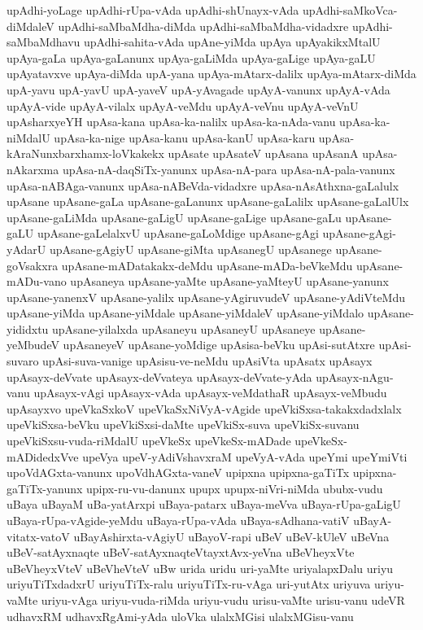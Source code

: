 {upAdhi-yoLage
upAdhi-rUpa-vAda
upAdhi-shUnayx-vAda
upAdhi-saMkoVca-diMdaleV
upAdhi-saMbaMdha-diMda
upAdhi-saMbaMdha-vidadxre
upAdhi-saMbaMdhavu
upAdhi-sahita-vAda
upAne-yiMda
upAya
upAyakikxMtalU
upAya-gaLa
upAya-gaLanunx
upAya-gaLiMda
upAya-gaLige
upAya-gaLU
upAyatavxve
upAya-diMda
upA-yana
upAya-mAtarx-dalilx
upAya-mAtarx-diMda
upA-yavu
upA-yavU
upA-yaveV
upA-yAvagade
upAyA-vanunx
upAyA-vAda
upAyA-vide
upAyA-vilalx
upAyA-veMdu
upAyA-veVnu
upAyA-veVnU
upAsharxyeYH
upAsa-kana
upAsa-ka-nalilx
upAsa-ka-nAda-vanu
upAsa-ka-niMdalU
upAsa-ka-nige
upAsa-kanu
upAsa-kanU
upAsa-karu
upAsa-kAraNunxbarxhamx-loVkakekx
upAsate
upAsateV
upAsana
upAsanA
upAsa-nAkarxma
upAsa-nA-daqSiTx-yanunx
upAsa-nA-para
upAsa-nA-pala-vanunx
upAsa-nABAga-vanunx
upAsa-nABeVda-vidadxre
upAsa-nAsAthxna-gaLalulx
upAsane
upAsane-gaLa
upAsane-gaLanunx
upAsane-gaLalilx
upAsane-gaLalUlx
upAsane-gaLiMda
upAsane-gaLigU
upAsane-gaLige
upAsane-gaLu
upAsane-gaLU
upAsane-gaLelalxvU
upAsane-gaLoMdige
upAsane-gAgi
upAsane-gAgi-yAdarU
upAsane-gAgiyU
upAsane-giMta
upAsanegU
upAsanege
upAsane-goVsakxra
upAsane-mADatakakx-deMdu
upAsane-mADa-beVkeMdu
upAsane-mADu-vano
upAsaneya
upAsane-yaMte
upAsane-yaMteyU
upAsane-yanunx
upAsane-yanenxV
upAsane-yalilx
upAsane-yAgiruvudeV
upAsane-yAdiVteMdu
upAsane-yiMda
upAsane-yiMdale
upAsane-yiMdaleV
upAsane-yiMdalo
upAsane-yididxtu
upAsane-yilalxda
upAsaneyu
upAsaneyU
upAsaneye
upAsane-yeMbudeV
upAsaneyeV
upAsane-yoMdige
upAsisa-beVku
upAsi-sutAtxre
upAsi-suvaro
upAsi-suva-vanige
upAsisu-ve-neMdu
upAsiVta
upAsatx
upAsayx
upAsayx-deVvate
upAsayx-deVvateya
upAsayx-deVvate-yAda
upAsayx-nAgu-vanu
upAsayx-vAgi
upAsayx-vAda
upAsayx-veMdathaR
upAsayx-veMbudu
upAsayxvo
upeVkaSxkoV
upeVkaSxNiVyA-vAgide
upeVkiSxsa-takakxdadxlalx
upeVkiSxsa-beVku
upeVkiSxsi-daMte
upeVkiSx-suva
upeVkiSx-suvanu
upeVkiSxsu-vuda-riMdalU
upeVkeSx
upeVkeSx-mADade
upeVkeSx-mADidedxVve
upeVya
upeV-yAdiVshavxraM
upeVyA-vAda
upeYmi
upeYmiVti
upoVdAGxta-vanunx
upoVdhAGxta-vaneV
upipxna
upipxna-gaTiTx
upipxna-gaTiTx-yanunx
upipx-ru-vu-danunx
upupx
upupx-niVri-niMda
ububx-vudu
uBaya
uBayaM
uBa-yatArxpi
uBaya-patarx
uBaya-meVva
uBaya-rUpa-gaLigU
uBaya-rUpa-vAgide-yeMdu
uBaya-rUpa-vAda
uBaya-sAdhana-vatiV
uBayA-vitatx-vatoV
uBayAshirxta-vAgiyU
uBayoV-rapi
uBeV
uBeV-kUleV
uBeVna
uBeV-satAyxnaqte
uBeV-satAyxnaqteVtayxtAvx-yeVna
uBeVheyxVte
uBeVheyxVteV
uBeVheVteV
uBw
urida
uridu
uri-yaMte
uriyalapxDalu
uriyu
uriyuTiTxdadxrU
uriyuTiTx-ralu
uriyuTiTx-ru-vAga
uri-yutAtx
uriyuva
uriyu-vaMte
uriyu-vAga
uriyu-vuda-riMda
uriyu-vudu
urisu-vaMte
urisu-vanu
udeVR
udhavxRM
udhavxRgAmi-yAda
uloVka
ulalxMGisi
ulalxMGisu-vanu
}
